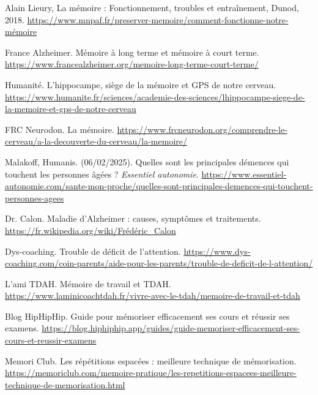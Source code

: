 \documentclass[12pt,a4paper]{report}
\begin{document}
\begin{thebibliography}{9}

        Alain Lieury, La mémoire : Fonctionnement, troubles et entraînement, Dunod, 2018.
        \url{https://www.mnpaf.fr/preserver-memoire/comment-fonctionne-notre-mémoire}

        France Alzheimer. Mémoire à long terme et mémoire à court terme. \break
        \url{https://www.francealzheimer.org/memoire-long-terme-court-terme/}
        
        Humanité. L'hippocampe, siège de la mémoire et GPS de notre cerveau. \break
        \url{https://www.humanite.fr/sciences/academie-des-sciences/lhippocampe-siege-de-la-memoire-et-gps-de-notre-cerveau}
        
        FRC Neurodon. La mémoire. \break
        \url{https://www.frcneurodon.org/comprendre-le-cerveau/a-la-decouverte-du-cerveau/la-memoire/}

        Malakoff, Humanis. (06/02/2025). Quelles sont les principales démences qui touchent les personnes âgées ? \textit{Essentiel autonomie}. \break
        \url{https://www.essentiel-autonomie.com/sante-mon-proche/quelles-sont-principales-demences-qui-touchent-personnes-agees}

        Dr. Calon. Maladie d'Alzheimer : causes, symptômes et traitements. \break
        \url{https://fr.wikipedia.org/wiki/Frédéric_Calon}
    
        Dys-coaching. Trouble de déficit de l'attention. \break
        \url{https://www.dys-coaching.com/coin-parents/aide-pour-les-parents/trouble-de-deficit-de-l-attention/}

        L'ami TDAH. Mémoire de travail et TDAH. \break
    \url{https://www.laminicoachtdah.fr/vivre-avec-le-tdah/memoire-de-travail-et-tdah}

        Blog HipHipHip. Guide pour mémoriser efficacement ses cours et réussir ses examens. \break
    \url{https://blog.hiphiphip.app/guides/guide-memoriser-efficacement-ses-cours-et-reussir-examens}

        Memori Club. Les répétitions espacées : meilleure technique de mémorisation. \break
    \url{https://memoriclub.com/memoire-pratique/les-repetitions-espacees-meilleure-technique-de-memorisation.html}


\end{thebibliography}
\end{document}
